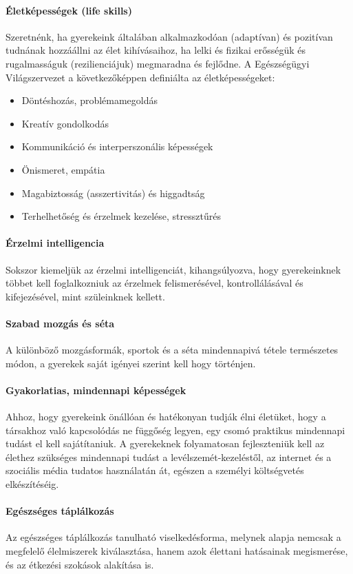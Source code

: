 \paragraph{Életképességek (life skills)}

Szeretnénk, ha gyerekeink általában alkalmazkodóan (adaptívan) és pozitívan tudnának hozzáállni az élet kihívásaihoz, ha lelki és fizikai erősségük és rugalmasságuk (rezilienciájuk) megmaradna és fejlődne.	 A Egészségügyi Világszervezet \citep{oecd99lifeskills} a következőképpen definiálta  az életképességeket:
\begin{itemize}
  \item Döntéshozás, problémamegoldás

  \item Kreatív gondolkodás

  \item Kommunikáció és interperszonális képességek

  \item Önismeret, empátia

  \item Magabiztosság (asszertivitás) és higgadtság

  \item Terhelhetőség és érzelmek kezelése, stressztűrés
\end{itemize}
\paragraph{Érzelmi intelligencia}

Sokszor kiemeljük az érzelmi intelligenciát, kihangsúlyozva, hogy gyerekeinknek többet kell foglalkozniuk az érzelmek felismerésével, kontrollálásával és kifejezésével, mint szüleinknek kellett.

\paragraph{Szabad mozgás és séta}

A különböző mozgásformák, sportok és a séta mindennapivá tétele természetes módon, a gyerekek saját igényei szerint kell hogy történjen.

\paragraph{Gyakorlatias, mindennapi képességek}

Ahhoz, hogy gyerekeink önállóan és hatékonyan tudják élni életüket, hogy a társakhoz való kapcsolódás ne függőség legyen, egy csomó praktikus mindennapi tudást el kell sajátítaniuk. A gyerekeknek folyamatosan fejleszteniük kell az élethez szükséges mindennapi tudást a levélszemét-kezeléstől, az internet és a szociális média tudatos használatán át, egészen a személyi költségvetés elkészítéséig.

\paragraph{Egészséges táplálkozás}

Az egészséges táplálkozás tanulható viselkedésforma, melynek alapja nemcsak a megfelelő élelmiszerek kiválasztása, hanem azok élettani hatásainak megismerése, és az étkezési szokások alakítása is.

